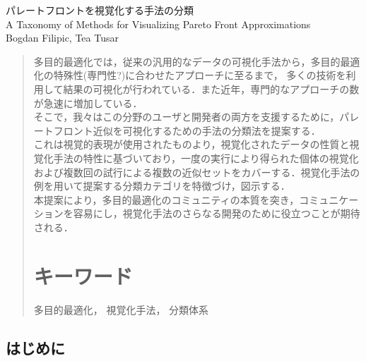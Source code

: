 \documentclass[autodetect-engine,dvipdfmx-if-dvi,ja=standard,a4paper,12pt]{bxjsarticle}
\begin{document}
      \begin{center}
      \large{パレートフロントを視覚化する手法の分類} \\
      A Taxonomy of Methods for Visualizing Pareto Front Approximations\\
      \normalsize Bogdan Filipic, Tea Tusar\\
      \vspace*{10pt}
      \begin{abstract}
      多目的最適化では，従来の汎用的なデータの可視化手法から，多目的最適化の特殊性(専門性?)に合わせたアプローチに至るまで，
      多くの技術を利用して結果の可視化が行われている．また近年，専門的なアプローチの数が急速に増加している．\\
      そこで，我々はこの分野のユーザと開発者の両方を支援するために，パレートフロント近似を可視化するための手法の分類法を提案する．\\
      これは視覚的表現が使用されたものより，視覚化されたデータの性質と視覚化手法の特性に基づいており，一度の実行により得られた個体の視覚化および複数回の試行による複数の近似セットをカバーする．視覚化手法の例を用いて提案する分類カテゴリを特徴づけ，図示する．\\
      本提案により，多目的最適化のコミュニティの本質を突き，コミュニケーションを容易にし，視覚化手法のさらなる開発のために役立つことが期待される．
      
      \vspace*{-10pt}
      \section*{キーワード}
      \vspace{-10pt}
      多目的最適化， 視覚化手法， 分類体系
      \end{abstract}
      \end{center}

    \begin{multicols}{2}
      \section{はじめに}

      
 
    \end{multicols}   
    
\end{document}

